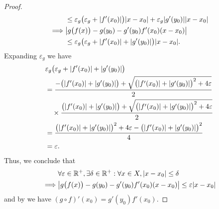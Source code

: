 \begin{proof}
\begin{align*}
             & \leq \varepsilon_g \big(\varepsilon_g + \abs{f'(x_0)}\big) \abs{x - x_0} + \varepsilon_g \abs{g'(y_0)} \abs{x - x_0} \\
    \implies & \abs{g\big(f(x)\big) - g(y_0) - g'(y_0) f'(x_0) (x - x_0)}                                                           \\
             & \leq \varepsilon_g \big(\varepsilon_g + \abs{f'(x_0)} + \abs{g'(y_0)}\big) \abs{x - x_0}.
  \end{align*}
  Expanding \(\varepsilon_g\) we have
  \begin{align*}
     & \varepsilon_g \big(\varepsilon_g + \abs{f'(x_0)} + \abs{g'(y_0)}\big)                                                              \\
     & = \dfrac{-\big(\abs{f'(x_0)} + \abs{g'(y_0)}\big) + \sqrt{\big(\abs{f'(x_0)} + \abs{g'(y_0)}\big)^2 + 4 \varepsilon}}{2}           \\
     & \quad \times \dfrac{\big(\abs{f'(x_0)} + \abs{g'(y_0)}\big) + \sqrt{\big(\abs{f'(x_0)} + \abs{g'(y_0)}\big)^2 + 4 \varepsilon}}{2} \\
     & = \dfrac{\big(\abs{f'(x_0)} + \abs{g'(y_0)}\big)^2 + 4 \varepsilon - \big(\abs{f'(x_0)} + \abs{g'(y_0)}\big)^2}{4}                 \\
     & = \varepsilon.
  \end{align*}
  Thus, we conclude that
  \begin{align*}
             & \forall \varepsilon \in \R^+, \exists \delta \in \R^+ : \forall x \in X, \abs{x - x_0} \leq \delta \\
    \implies & \abs{g\big(f(x)\big) - g(y_0) - g'(y_0) f'(x_0) (x - x_0)} \leq \varepsilon \abs{x - x_0}
  \end{align*}
  and by  we have \((g \circ f)'(x_0) = g'(y_0) f'(x_0)\).
\end{proof}

